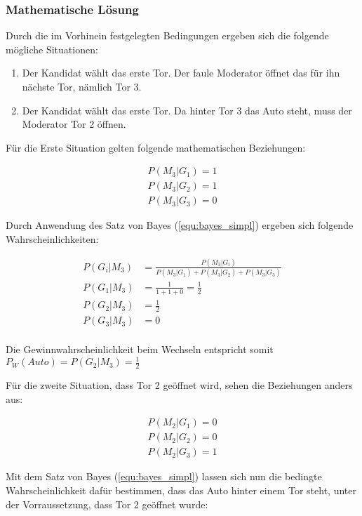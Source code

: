 \subsubsection{Mathematische Lösung}

Durch die im Vorhinein festgelegten Bedingungen ergeben sich die folgende mögliche Situationen:
\begin{enumerate}
    \item Der Kandidat wählt das erste Tor. Der faule Moderator öffnet das für ihn nächste Tor, nämlich Tor 3.
    \item Der Kandidat wählt das erste Tor. Da hinter Tor 3 das Auto steht, muss der Moderator Tor 2 öffnen.
\end{enumerate}

Für die Erste Situation gelten folgende mathematischen Beziehungen:

\begin{align*}
    P(M_3 | G_1) = 1 \\
    P(M_3 | G_2) = 1 \\
    P(M_3 | G_3) = 0
\end{align*}

Durch Anwendung des Satz von Bayes (\autoref{equ:bayes_simpl}) ergeben sich folgende Wahrscheinlichkeiten:

\begin{align*}
    P(G_i | M_3) & = \frac{P(M_3 | G_i)}{P(M_3 | G_1) + P(M_3 | G_2) + P(M_3 | G_3)} \\
    P(G_1 | M_3) & = \frac{1}{1+1+0} = \frac{1}{2}                                   \\
    P(G_2 | M_3) & = \frac{1}{2}                                                     \\
    P(G_3 | M_3) & = 0                                                               \\
\end{align*}

Die Gewinnwahrscheinlichkeit beim Wechseln entspricht somit $P_W(Auto) = P(G_2 | M_3) = \frac{1}{2}$

Für die zweite Situation, dass Tor 2 geöffnet wird, sehen die Beziehungen anders aus:

\begin{align*}
    P(M_2 | G_1) = 0 \\
    P(M_2 | G_2) = 0 \\
    P(M_2 | G_3) = 1
\end{align*}

Mit dem Satz von Bayes (\autoref{equ:bayes_simpl}) lassen sich nun die bedingte Wahrscheinlichkeit dafür bestimmen, dass das Auto hinter einem Tor steht, unter der Vorraussetzung, dass Tor 2 geöffnet wurde:

